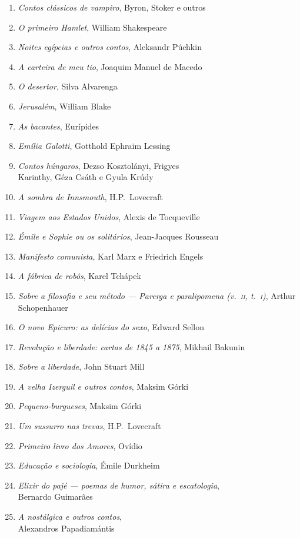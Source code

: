 \begin{enumerate}
\item \textit{Contos clássicos de vampiro}, Byron, Stoker e outros
\item \textit{O primeiro Hamlet}, William Shakespeare
\item \textit{Noites egípcias e outros contos}, Aleksandr Púchkin
\item \textit{A carteira de meu tio}, Joaquim Manuel de Macedo
\item \textit{O desertor}, Silva Alvarenga
\item \textit{Jerusalém}, William Blake
\item \textit{As bacantes}, Eurípides
\item \textit{Emília Galotti}, Gotthold Ephraim Lessing
\item \textit{Contos húngaros}, Dezso Kosztolányi, Frigyes\\ Karinthy, Géza Csáth e Gyula Krúdy
\item \textit{A sombra de Innsmouth}, H.P.~Lovecraft
\item \textit{Viagem aos Estados Unidos}, Alexis de Tocqueville
\item \textit{Émile e Sophie ou os solitários}, Jean-Jacques Rousseau 
\item \textit{Manifesto comunista}, Karl Marx e Friedrich Engels
\item \textit{A fábrica de robôs}, Karel Tchápek 
\item \textit{Sobre a filosofia e seu método --- Parerga e paralipomena (v.~\textsc{ii}, t.~\textsc{i})}, Arthur Schopenhauer 
\item \textit{O novo Epicuro: as delícias do sexo}, Edward Sellon
\item \textit{Revolução e liberdade: cartas de 1845 a 1875}, Mikhail Bakunin
\item \textit{Sobre a liberdade}, John Stuart Mill
\item \textit{A velha Izerguil e outros contos}, Maksim Górki
\item \textit{Pequeno-burgueses}, Maksim Górki
\item \textit{Um sussurro nas trevas}, H.P.~Lovecraft
\item \textit{Primeiro livro dos Amores}, Ovídio
\item \textit{Educação e sociologia}, Émile Durkheim
\item \textit{Elixir do pajé --- poemas de humor, sátira e escatologia},\\ Bernardo Guimarães
\item \textit{A nostálgica e outros contos},\\ Alexandros Papadiamántis 

\end{enumerate}
